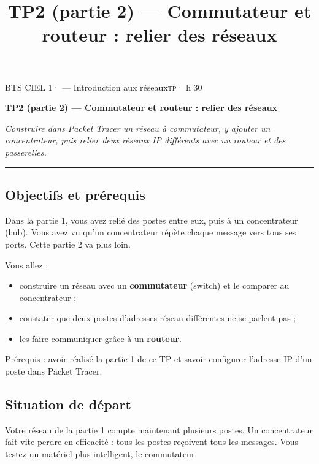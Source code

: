 \documentclass[
  french,
  10pt,
  a4paper,
]{scrartcl}
\title{TP2 (partie 2) --- Commutateur et routeur : relier des réseaux}
\author{}
\date{}
\providecommand{\tightlist}{%
  \setlength{\itemsep}{0pt}\setlength{\parskip}{0pt}}
\begin{document}
\thispagestyle{plain.scrheadings}
{\footnotesize\color{vertprofond}\textsc{BTS CIEL 1}\enspace·
--- Introduction aux réseaux\hfill \textsc{tp}\enspace· h
30\par}
\vspace{0.6ex}
{\LARGE\bfseries\color{vertprofond}TP2 (partie 2) --- Commutateur et
routeur : relier des réseaux\par}
\vspace{0.5ex}
{\itshape Construire dans Packet Tracer un réseau à commutateur, y
ajouter un concentrateur, puis relier deux réseaux IP différents avec un
routeur et des passerelles.\par}
\vspace{0.3ex}
{\color{vertprofond}\rule{\linewidth}{0.8pt}\par}
\vspace{0.8ex}


\subsection{Objectifs et prérequis}\label{objectifs-et-pruxe9requis}

Dans la partie 1, vous avez relié des postes entre eux, puis à un
concentrateur (hub). Vous avez vu qu'un concentrateur répète chaque
message vers tous ses ports. Cette partie 2 va plus loin.

Vous allez :

\begin{itemize}
\tightlist
\item
  construire un réseau avec un \textbf{commutateur} (switch) et le
  comparer au concentrateur ;
\item
  constater que deux postes d'adresses réseau différentes ne se parlent
  pas ;
\item
  les faire communiquer grâce à un \textbf{routeur}.
\end{itemize}

Prérequis : avoir réalisé la
\href{../tp-creation-lan-1/index.qmd}{partie 1 de ce TP} et savoir
configurer l'adresse IP d'un poste dans Packet Tracer.

\subsection{Situation de départ}\label{situation-de-duxe9part}

Votre réseau de la partie 1 compte maintenant plusieurs postes. Un
concentrateur fait vite perdre en efficacité : tous les postes reçoivent
tous les messages. Vous testez un matériel plus intelligent, le
commutateur.
\end{document}
